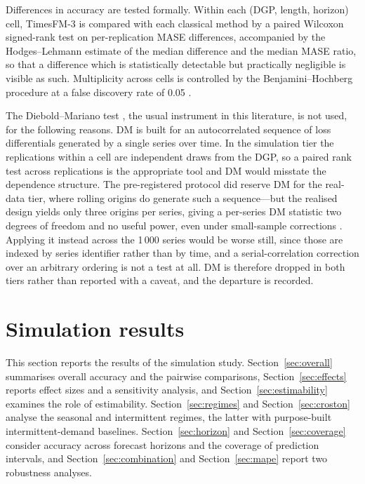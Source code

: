\documentclass[article]{ajs}
\providecommand{\sectionref}[1]{Section~\ref{#1}}
\begin{document}
Differences in accuracy are tested formally. Within each (DGP, length, horizon)
cell, TimesFM-3 is compared with each classical method by a paired Wilcoxon signed-rank test
\citep{wilcoxon1945} on per-replication MASE differences, accompanied by the Hodges--Lehmann
estimate of the median difference \citep{hodges1963} and the median MASE ratio, so that a
difference which is statistically detectable but practically negligible is visible as such.
Multiplicity across cells is controlled by the Benjamini--Hochberg procedure at a false
discovery rate of 0.05 \citep{benjamini1995fdr}.

The Diebold--Mariano test \citep{diebold1995comparing}, the usual instrument in this
literature, is not used, for the following reasons. DM is built for an autocorrelated sequence of loss differentials
generated by a single series over time. In the simulation tier the replications within a cell
are independent draws from the DGP, so a paired rank test across replications is the
appropriate tool and DM would misstate the dependence structure. The pre-registered protocol
did reserve DM for the real-data tier, where rolling origins do generate such a sequence---but
the realised design yields only three origins per series, giving a per-series DM statistic two
degrees of freedom and no useful power, even under small-sample corrections \citep{harvey1997testing}. Applying it instead across the 1\,000 series would be
worse still, since those are indexed by series identifier rather than by time, and a
serial-correlation correction over an arbitrary ordering is not a test at all. DM is therefore
dropped in both tiers rather than reported with a caveat, and the departure is recorded.

\section{Simulation results}
\label{sec:results}

This section reports the results of the simulation study. \sectionref{sec:overall} summarises
overall accuracy and the pairwise comparisons, \sectionref{sec:effects} reports effect sizes and a
sensitivity analysis, and \sectionref{sec:estimability} examines the role of estimability.
\sectionref{sec:regimes} and \sectionref{sec:croston} analyse the seasonal and intermittent
regimes, the latter with purpose-built intermittent-demand baselines. \sectionref{sec:horizon}
and \sectionref{sec:coverage} consider accuracy across forecast horizons and the coverage of
prediction intervals, and \sectionref{sec:combination} and \sectionref{sec:mape} report two
robustness analyses.
\end{document}
